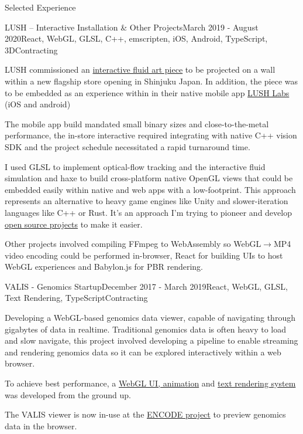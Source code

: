 \documentclass{resume} %
\begin{document}
\begin{rSection}{Selected Experience}
\begin{rSubsection}{LUSH – Interactive Installation \& Other Projects}{March 2019 - August 2020}{React, WebGL, GLSL, C++, emscripten, iOS, Android, TypeScript, 3D}{Contracting}
\item LUSH commissioned an \href{https://twitter.com/Haxiomic/status/1146820050445393921?s=20}{interactive fluid art piece} to be projected on a wall within a new flagship store opening in Shinjuku Japan. In addition, the piece was to be embedded as an experience within in their native mobile app \href{https://apps.apple.com/gb/app/lush-labs/id1439333565}{LUSH Labs} (iOS and android)
\item The mobile app build mandated small binary sizes and close-to-the-metal performance, the in-store interactive required integrating with native C++ vision SDK and the project schedule necessitated a rapid turnaround time.
\item I used GLSL to implement optical-flow tracking and the interactive fluid simulation and haxe to build cross-platform native OpenGL views that could be embedded easily within native and web apps with a low-footprint. This approach represents an alternative to heavy game engines like Unity and slower-iteration languages like C++ or Rust. It's an approach I'm trying to pioneer and develop \href{https://github.com/haxiomic/haxe-c-bridge}{open source projects} to make it easier.
\item Other projects involved compiling FFmpeg to WebAssembly so WebGL$\rightarrow$MP4 video encoding could be performed in-browser, React for building UIs to host WebGL experiences and Babylon.js for PBR rendering.
\end{rSubsection}

\begin{rSubsection}{VALIS - Genomics Startup}{December 2017 - March 2019}{React, WebGL, GLSL, Text Rendering, TypeScript}{Contracting}
\item Developing a WebGL-based genomics data viewer, capable of navigating through gigabytes of data in realtime. Traditional genomics data is often heavy to load and slow navigate, this project involved developing a pipeline to enable streaming and rendering genomics data so it can be explored interactively within a web browser.
\item To achieve best performance, a \href{https://github.com/VALIS-software/Engine}{WebGL UI, animation} and \href{https://github.com/VALIS-software/GPUText}{text rendering system} was developed from the ground up.
\item The VALIS viewer is now in-use at the \href{https://www.encodeproject.org/}{ENCODE project} to preview genomics data in the browser.
\end{rSubsection}


\end{rSection}
\end{document}
